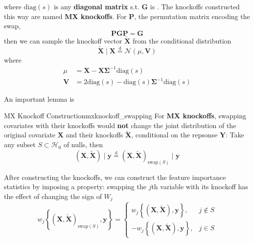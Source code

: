 \documentclass[twoside]{article}
\begin{document}
where $\mathrm{diag}(s)$ is any \textbf{diagonal matrix} s.t. $\boldsymbol{G}$ is . The knockoffs constructed this way are named \textbf{MX knockoffs}. For $\mathbf{P}$, the permutation matrix encoding the swap,
$$
\mathbf{PGP} = \mathbf{G}
$$
then we can sample the knockoff vector $\tilde{\mathbf{X}}$ from the conditional distribution
$$
\tilde{\mathbf{X}} \mid \mathbf{X} \overset{\mathrm{d}}{=}\mathcal{N}(\mu,\mathbf{V})
$$
where 
\begin{align*}
    \mu &= \mathbf{X} - \mathbf{X}\boldsymbol{\Sigma}^{-1}\mathrm{diag}(s)\\
    \mathbf{V} &= 2\mathrm{diag}(s) - \mathrm{diag}(s)\boldsymbol{\Sigma}^{-1}\mathrm{diag}(s)
\end{align*}

An important lemma is
\begin{lemma}{MX Knockoff Construction}{mxknockoff_swapping}
    For {\textbf{MX knockoffs}}, swapping  covariates with their knockoffs would \textbf{not} change the joint distribution of the original covariate $\mathbf{X}$ and their knockoffs $\tilde{\mathbf{X}}$, conditional on the repsonse $\mathbf{Y}$: Take any subset $S\subset \mathcal{H}_0$ of nulls, then
    $$
    \left( \mathbf{X},\tilde{\mathbf{X}} \right)\mid \mathbf{y} \overset{\mathrm{d}}{=} \left(\mathbf{X},\tilde{\mathbf{X}}\right)_{\mathrm{swap}(S)}\mid \mathbf{y}
    $$
\end{lemma}

After constructing the knockoffs, we can construct the feature importance statistics by imposing a  property: swapping the $j$th variable with its knockoff has the effect of changing the sign of $W_j$ 
$$
 w_j\left\{ (\mathbf{X},\tilde{\mathbf{X}})_{\mathrm{swap}(S)},\mathbf{y} \right\} = \begin{cases}
    w_j\left\{ (\mathbf{X},\tilde{\mathbf{X}}),\mathbf{y} \right\}, & j\not\in S \\
    -w_j \left\{ (\mathbf{X},\tilde{\mathbf{X}}),\mathbf{y} \right\}, & j\in S
 \end{cases}
$$


\newpage


\end{document}
